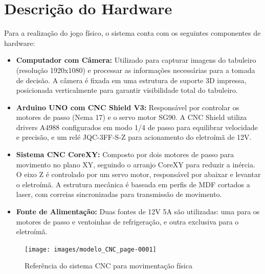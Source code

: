 \documentclass[a4paper,12pt]{article}
\begin{document}
\section{Descrição do Hardware}
Para a realização do jogo físico, o sistema conta com os seguintes componentes de hardware:
\begin{itemize}
    \item \textbf{Computador com Câmera:} Utilizado para capturar imagens do tabuleiro (resolução 1920x1080) e processar as informações necessárias para a tomada de decisão. A câmera é fixada em uma estrutura de suporte 3D impressa, posicionada verticalmente para garantir visibilidade total do tabuleiro.
    \item \textbf{Arduino UNO com CNC Shield V3:} Responsável por controlar os motores de passo (Nema 17) e o servo motor SG90. A CNC Shield utiliza drivers A4988 configurados em modo 1/4 de passo para equilibrar velocidade e precisão, e um relé JQC-3FF-S-Z para acionamento do eletroímã de 12V.
    \item \textbf{Sistema CNC CoreXY:} Composto por dois motores de passo para movimento no plano XY, seguindo o arranjo CoreXY para reduzir a inércia. O eixo Z é controlado por um servo motor, responsável por abaixar e levantar o eletroímã. A estrutura mecânica é baseada em perfis de MDF cortados a laser, com correias sincronizadas para transmissão de movimento.
    \item \textbf{Fonte de Alimentação:} Duas fontes de 12V 5A são utilizadas: uma para os motores de passo e ventoinhas de refrigeração, e outra exclusiva para o eletroímã.
\end{itemize}

\begin{figure}[H]
    \centering
    \texttt{[image: images/modelo\_CNC\_page-0001]} %
    \caption{Referência do sistema CNC para movimentação física}
    \label{fig:modelo_cnc}
\end{figure}
\end{document}
